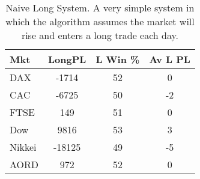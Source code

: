 \begin{table}[ht]
\centering
\caption[Results from the Naive Long System]{Naive Long System. A very simple system in which the algorithm assumes the market will rise and enters a long trade each day.} 
\label{tab:nlng_results}
\begin{tabular}{lccc}
  \toprule Mkt & LongPL & L Win \% & Av L PL \\ 
  \midrule DAX & -1714 & 52 & 0 \\ 
  CAC & -6725 & 50 & -2 \\ 
  FTSE & 149 & 51 & 0 \\ 
  Dow & 9816 & 53 & 3 \\ 
  Nikkei & -18125 & 49 & -5 \\ 
  AORD & 972 & 52 & 0 \\ 
   \bottomrule \end{tabular}
\end{table}
